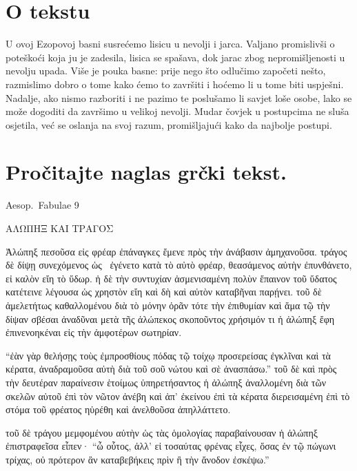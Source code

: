 
\section*{O tekstu}

U ovoj Ezopovoj basni susrećemo lisicu u nevolji i jarca. Valjano promislivši o poteškoći koja ju je zadesila, lisica se spašava, dok jarac zbog nepromišljenosti u nevolju upada. Više je pouka basne: prije nego što odlučimo započeti nešto, razmislimo dobro o tome kako ćemo to završiti i hoćemo li u tome biti uspješni. Nadalje, ako nismo razboriti i ne pazimo te poslušamo li savjet loše osobe, lako se može dogoditi da završimo u velikoj nevolji. Mudar čovjek u postupcima ne sluša osjetila, već se oslanja na svoj razum, promišljajući kako da najbolje postupi.


\section*{Pročitajte naglas grčki tekst.}

Aesop.\ Fabulae 9


\medskip

\begin{greek}
{\large
{ \noindent ΑΛΩΠΗΞ ΚΑΙ ΤΡΑΓΟΣ 

\medskip

\noindent Ἀλώπηξ πεσοῦσα εἰς φρέαρ ἐπάναγκες ἔμενε πρὸς τὴν ἀνάβασιν ἀμηχανοῦσα. τράγος δὲ δίψῃ συνεχόμενος ὡς  ἐγένετο κατὰ τὸ αὐτὸ φρέαρ, θεασάμενος αὐτὴν ἐπυνθάνετο, εἰ καλὸν εἴη τὸ ὕδωρ. ἡ δὲ τὴν συντυχίαν ἀσμενισαμένη πολὺν ἔπαινον τοῦ ὕδατος κατέτεινε λέγουσα ὡς χρηστὸν εἴη καὶ δὴ καὶ αὐτὸν καταβῆναι παρῄνει. τοῦ δὲ ἀμελετήτως καθαλλομένου διὰ τὸ μόνην ὁρᾶν τότε τὴν ἐπιθυμίαν καὶ ἅμα τῷ τὴν δίψαν σβέσαι ἀναδῦναι μετὰ τῆς ἀλώπεκος σκοποῦντος χρήσιμόν τι ἡ ἀλώπηξ ἔφη ἐπινενοηκέναι εἰς τὴν ἀμφοτέρων σωτηρίαν. 

\noindent ``ἐὰν γὰρ θελήσῃς τοὺς ἐμπροσθίους πόδας τῷ τοίχῳ προσερείσας ἐγκλῖναι καὶ τὰ κέρατα, ἀναδραμοῦσα αὐτὴ διὰ τοῦ σοῦ νώτου καὶ σὲ ἀνασπάσω.'' τοῦ δὲ καὶ πρὸς τὴν δευτέραν παραίνεσιν ἑτοίμως ὑπηρετήσαντος ἡ ἀλώπηξ ἀναλλομένη διὰ τῶν σκελῶν αὐτοῦ ἐπὶ τὸν νῶτον ἀνέβη καὶ ἀπ' ἐκείνου ἐπὶ τὰ κέρατα διερεισαμένη ἐπὶ τὸ στόμα τοῦ φρέατος ηὑρέθη καὶ ἀνελθοῦσα ἀπηλλάττετο. 

\noindent τοῦ δὲ τράγου μεμφομένου αὐτὴν ὡς τὰς ὁμολογίας παραβαίνουσαν ἡ ἀλώπηξ ἐπιστραφεῖσα εἶπεν· ``ὦ οὗτος, ἀλλ' εἰ τοσαύτας φρένας εἶχες, ὅσας ἐν τῷ πώγωνι τρίχας, οὐ πρότερον ἂν καταβεβήκεις πρὶν ἢ τὴν ἄνοδον ἐσκέψω.''

}
}
\end{greek}

